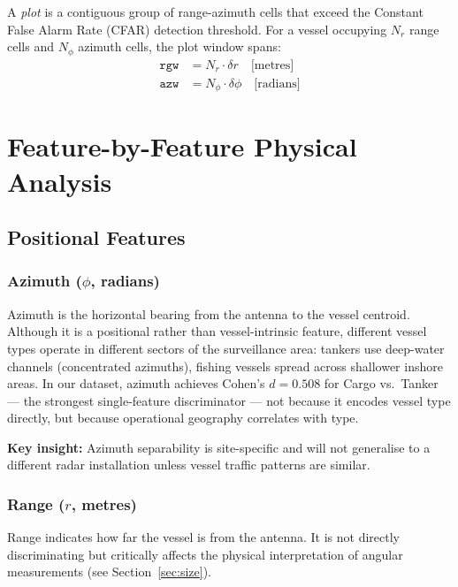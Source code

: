 \documentclass[journal]{IEEEtran}
\begin{document}
A \emph{plot} is a contiguous group of range-azimuth cells that exceed the
Constant False Alarm Rate (CFAR) detection threshold. For a vessel occupying
$N_r$ range cells and $N_\phi$ azimuth cells, the plot window spans:
\begin{align}
  \texttt{rgw} &= N_r \cdot \delta r \quad \text{[metres]} \label{eq:rgw}\\
  \texttt{azw} &= N_\phi \cdot \delta\phi \quad \text{[radians]} \label{eq:azw}
\end{align}

\section{Feature-by-Feature Physical Analysis}
\label{sec:features}

\subsection{Positional Features}

\subsubsection{Azimuth ($\phi$, radians)}

Azimuth is the horizontal bearing from the antenna to the vessel centroid.
Although it is a positional rather than vessel-intrinsic feature, different
vessel types operate in different sectors of the surveillance area:
tankers use deep-water channels (concentrated azimuths), fishing vessels spread
across shallower inshore areas. In our dataset, azimuth achieves
Cohen's $d = 0.508$ for Cargo vs.\ Tanker — the strongest single-feature
discriminator — not because it encodes vessel type directly, but because
operational geography correlates with type.

\textbf{Key insight:} Azimuth separability is site-specific and will not
generalise to a different radar installation unless vessel traffic patterns
are similar.

\subsubsection{Range ($r$, metres)}

Range indicates how far the vessel is from the antenna. It is not directly
discriminating but critically affects the physical interpretation of angular
measurements (see Section~\ref{sec:size}).
\end{document}
